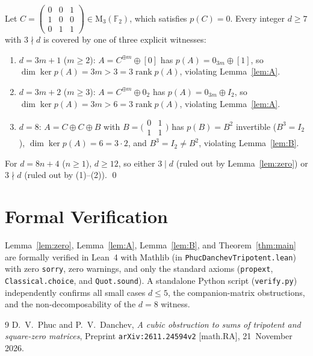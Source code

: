 \documentclass[11pt]{article}
\begin{document}
Let $C = \left(\begin{smallmatrix} 0 & 0 & 1 \\ 1 & 0 & 0 \\ 0 & 1 & 1 \end{smallmatrix}\right) \in \mathrm{M}_3(\mathbb{F}_2)$, which satisfies $p(C) = 0$. Every integer $d \ge 7$ with $3 \nmid d$ is covered by one of three explicit witnesses:
\begin{enumerate}
  \item $d = 3m + 1$ ($m \ge 2$): $A = C^{\oplus m} \oplus [0]$ has $p(A) = 0_{3m} \oplus [1]$, so $\dim \ker p(A) = 3m > 3 = 3\operatorname{rank} p(A)$, violating Lemma~\ref{lem:A}.
  \item $d = 3m + 2$ ($m \ge 3$): $A = C^{\oplus m} \oplus 0_2$ has $p(A) = 0_{3m} \oplus I_2$, so $\dim \ker p(A) = 3m > 6 = 3\operatorname{rank} p(A)$, violating Lemma~\ref{lem:A}.
  \item $d = 8$: $A = C \oplus C \oplus B$ with $B = \bigl(\begin{smallmatrix} 0 & 1 \\ 1 & 1 \end{smallmatrix}\bigr)$ has $p(B) = B^2$ invertible ($B^3 = I_2$), $\dim \ker p(A) = 6 = 3 \cdot 2$, and $B^3 = I_2 \neq B^2$, violating Lemma~\ref{lem:B}.
\end{enumerate}
For $d = 8n + 4$ ($n \ge 1$), $d \ge 12$, so either $3 \mid d$ (ruled out by Lemma~\ref{lem:zero}) or $3 \nmid d$ (ruled out by (1)--(2)). \qed

\section*{Formal Verification}

Lemma~\ref{lem:zero}, Lemma~\ref{lem:A}, Lemma~\ref{lem:B}, and Theorem~\ref{thm:main} are formally verified in Lean~4 with Mathlib (in \texttt{PhucDanchevTripotent.lean}) with zero \texttt{sorry}, zero warnings, and only the standard axioms (\texttt{propext}, \texttt{Classical.choice}, and \texttt{Quot.sound}). A standalone Python script (\texttt{verify.py}) independently confirms all small cases $d \le 5$, the companion-matrix obstructions, and the non-decomposability of the $d = 8$ witness.

\begin{thebibliography}{9}
D.~V.~Phuc and P.~V.~Danchev,
\emph{A cubic obstruction to sums of tripotent and square-zero matrices},
Preprint \texttt{arXiv:2611.24594v2} [math.RA], 21~November 2026.
\end{thebibliography}
\end{document}
